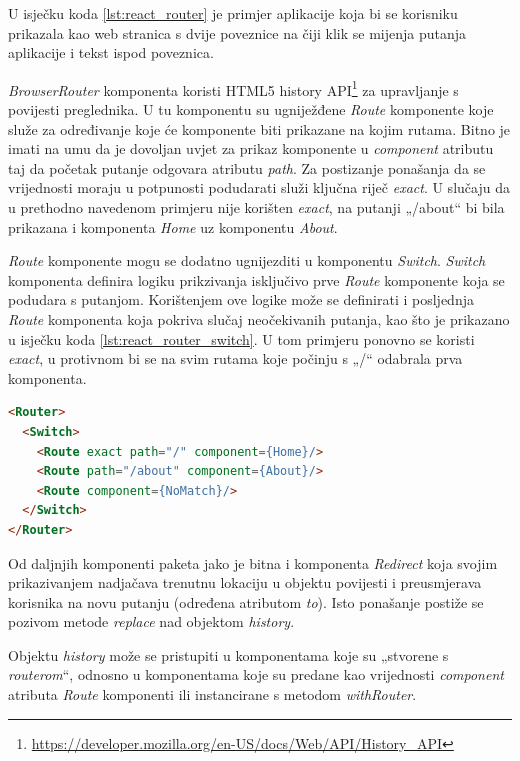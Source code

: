 \documentclass[times, utf8, diplomski, numeric]{fer}
\newcommand{\razmakp}{\vspace{18pt}}
\newcommand{\razmaks}{\vspace{10pt}}
\begin{document}
U isječku koda \ref{lst:react_router} je primjer aplikacije koja bi se korisniku prikazala kao web stranica s dvije poveznice na čiji klik se mijenja putanja aplikacije i tekst ispod poveznica.

\emph{BrowserRouter} komponenta koristi HTML5 history API\footnote{\url{https://developer.mozilla.org/en-US/docs/Web/API/History_API}} za upravljanje s povijesti preglednika.
U tu komponentu su ugniježđene \emph{Route} komponente koje služe za određivanje koje će komponente biti prikazane na kojim rutama.
Bitno je imati na umu da je dovoljan uvjet za prikaz komponente u \emph{component} atributu taj da početak putanje odgovara atributu \emph{path}.
Za postizanje ponašanja da se vrijednosti moraju u potpunosti podudarati služi ključna riječ \emph{exact}.
U slučaju da u prethodno navedenom primjeru nije korišten \emph{exact}, na putanji „/about“ bi bila prikazana i komponenta \emph{Home} uz komponentu \emph{About}.

\emph{Route} komponente mogu se dodatno ugnijezditi u komponentu \emph{Switch}.
\emph{Switch} komponenta definira logiku prikzivanja isključivo prve \emph{Route} komponente koja se podudara s putanjom.
Korištenjem ove logike može se definirati i posljednja \emph{Route} komponenta koja pokriva slučaj neočekivanih putanja, kao što je prikazano u isječku koda \ref{lst:react_router_switch}.
U tom primjeru ponovno se koristi \emph{exact}, u protivnom bi se na svim rutama koje počinju s „/“ odabrala prva komponenta.

\razmakp %
\begin{lstlisting}[language=html, caption={Primjer korištenja \emph{Switch}komponente}, label={lst:react_router_switch}]
<Router>
  <Switch>
    <Route exact path="/" component={Home}/>
    <Route path="/about" component={About}/>
    <Route component={NoMatch}/>
  </Switch>
</Router>
\end{lstlisting}
\razmaks

Od daljnjih komponenti paketa jako je bitna i komponenta \emph{Redirect} koja svojim prikazivanjem nadjačava trenutnu lokaciju u objektu povijesti i preusmjerava korisnika na novu putanju (određena atributom \emph{to}).
Isto ponašanje postiže se pozivom metode \emph{replace} nad objektom \emph{history}.

Objektu \emph{history} može se pristupiti u komponentama koje su „stvorene s \emph{routerom}“, odnosno u komponentama koje su predane kao vrijednosti \emph{component} atributa \emph{Route} komponenti ili instancirane s metodom \emph{withRouter}.
\end{document}
